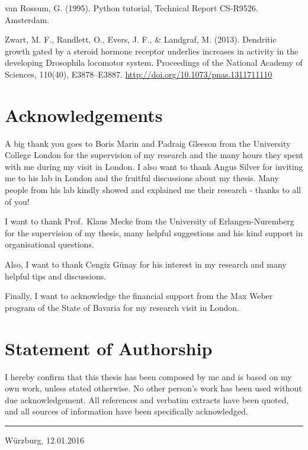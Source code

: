 \documentclass[12pt,a4paper,]{report}
\begin{document}
van Rossum, G. (1995). Python tutorial, Technical Report CS-R9526.
Amsterdam.

Zwart, M. F., Randlett, O., Evers, J. F., \& Landgraf, M. (2013).
Dendritic growth gated by a steroid hormone receptor underlies increases
in activity in the developing Drosophila locomotor system. Proceedings
of the National Academy of Sciences, 110(40), E3878--E3887.
\url{http://doi.org/10.1073/pnas.1311711110}

\chapter*{Acknowledgements}\label{acknowledgements}

A big thank you goes to Boris Marin and Padraig Gleeson from the
University College London for the supervision of my research and the
many hours they spent with me during my visit in London. I also want to
thank Angus Silver for inviting me to his lab in London and the fruitful
discussions about my thesis. Many people from his lab kindly showed and
explained me their research - thanks to all of you!

I want to thank Prof.~Klaus Mecke from the University of
Erlangen-Nuremberg for the supervision of my thesis, many helpful
suggestions and his kind support in organisational questions.

Also, I want to thank Cengiz Günay for his interest in my research and
many helpful tips and discussions.

Finally, I want to acknowledge the financial support from the Max Weber
program of the State of Bavaria for my research visit in London.

\chapter*{Statement of Authorship}\label{statement-of-authorship}

I hereby confirm that this thesis has been composed by me and is based
on my own work, unless stated otherwise. No other person's work has been
used without due acknowledgement. All references and verbatim extracts
have been quoted, and all sources of information have been specifically
acknowledged.

\vspace{20mm}

\centering

\begin{center}\rule{0.5\linewidth}{\linethickness}\end{center}

Würzburg, 12.01.2016
\end{document}
